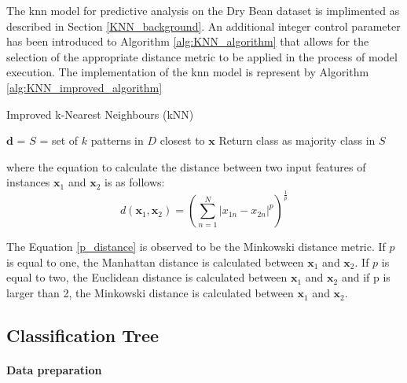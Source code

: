 \documentclass[10pt, conference]{IEEEtran}
\begin{document}
The \acrshort{knn} model for predictive analysis on the Dry Bean dataset is implimented as described
in Section \ref{KNN_background}. An additional integer control parameter has been introduced to
Algorithm \ref{alg:KNN_algorithm} that allows for the selection of the appropriate distance metric
to be applied in the process of model execution. The implementation of the \acrshort{knn} model is represent
by Algorithm \ref{alg:KNN_improved_algorithm}
\begin{algorithm}
    \caption{Improved k-Nearest Neighbours (kNN)}
    \label{alg:KNN_improved_algorithm}
    \begin{algorithmic}[1]
                \State $\boldsymbol{\textbf{d}}$ = 
            \EndFor
            \State {}
            \State $S$ = set of $k$ patterns in $D$ closest to $\boldsymbol{\textbf{x}}$
            \State Return class as majority class in $S$
        \EndFunction
    \end{algorithmic}
\end{algorithm}

where the equation to calculate the distance between two input features of instances
$\boldsymbol{\textbf{x}}_1$ and $\boldsymbol{\textbf{x}}_2$ is as follows:
\begin{equation}
    d(\boldsymbol{\textbf{x}}_1, \boldsymbol{\textbf{x}}_2) = \left(\sum_{n=1}^{N} \left| x_{1n} - x_{2n} \right|^p\right)^\frac{1}{p} \label{p_distance}
\end{equation}

The Equation \eqref{p_distance} is observed to be the Minkowski distance metric. If $p$ is equal to one, the Manhattan
distance is calculated between $\boldsymbol{\textbf{x}}_1$ and $\boldsymbol{\textbf{x}}_2$. If $p$ is equal to two,
the Euclidean distance is calculated between $\boldsymbol{\textbf{x}}_1$ and $\boldsymbol{\textbf{x}}_2$ and if
p is larger than 2, the Minkowski distance is calculated between $\boldsymbol{\textbf{x}}_1$ and $\boldsymbol{\textbf{x}}_2$.

\subsection{Classification Tree}

\paragraph{Data preparation}
\end{document}

